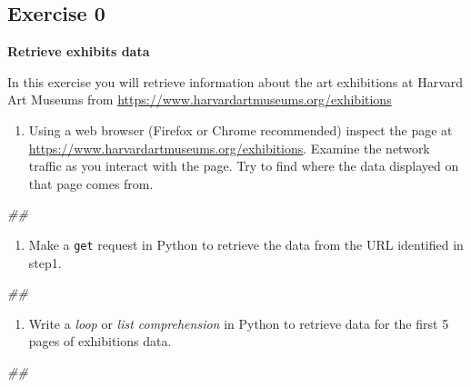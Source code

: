 \documentclass[]{book}
\newenvironment{Shaded}{\begin{snugshade}}{\end{snugshade}}
\newcommand{\CommentTok}[1]{\textcolor[rgb]{0.56,0.35,0.01}{\textit{#1}}}
\providecommand{\tightlist}{%
  \setlength{\itemsep}{0pt}\setlength{\parskip}{0pt}}
\begin{document}
\hypertarget{exercise-0-4}{%
\subsection{Exercise 0}\label{exercise-0-4}}

\textbf{Retrieve exhibits data}

In this exercise you will retrieve information about the art exhibitions at Harvard Art Museums from \url{https://www.harvardartmuseums.org/exhibitions}

\begin{enumerate}
\def\labelenumi{\arabic{enumi}.}
\tightlist
\item
  Using a web browser (Firefox or Chrome recommended) inspect the
  page at \url{https://www.harvardartmuseums.org/exhibitions}. Examine
  the network traffic as you interact with the page. Try to find
  where the data displayed on that page comes from.
\end{enumerate}

\begin{Shaded}
\begin{Highlighting}[]
\CommentTok{##}
\end{Highlighting}
\end{Shaded}

\begin{enumerate}
\def\labelenumi{\arabic{enumi}.}
\setcounter{enumi}{1}
\tightlist
\item
  Make a \texttt{get} request in Python to retrieve the data from the URL
  identified in step1.
\end{enumerate}

\begin{Shaded}
\begin{Highlighting}[]
\CommentTok{##}
\end{Highlighting}
\end{Shaded}

\begin{enumerate}
\def\labelenumi{\arabic{enumi}.}
\setcounter{enumi}{2}
\tightlist
\item
  Write a \emph{loop} or \emph{list comprehension} in Python to retrieve data
  for the first 5 pages of exhibitions data.
\end{enumerate}

\begin{Shaded}
\begin{Highlighting}[]
\CommentTok{##}
\end{Highlighting}
\end{Shaded}
\end{document}
